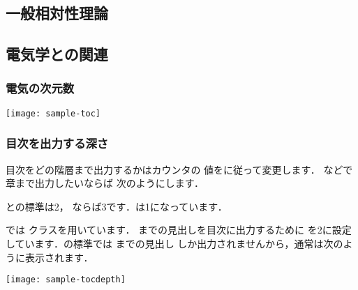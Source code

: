 \begin{inonly}
 \chapter{一般相対性理論}
  \section{電気学との関連}
    \subsection{電気の次元数}

\end{inonly}

\begin{outonly}
\noindent\texttt{[image: sample-toc]}
\end{outonly}


\subsection{目次を出力する深さ}
\begin{usage}
\end{usage}

%
%
目次をどの階層まで出力するかはカウンタの
値をに従って変更します．
などで章まで出力したいならば
次のようにします．

\begin{intext}
\end{intext}


との標準は2，
ならば3です．は1になっています．

では クラスを用いています．
までの見出しを目次に出力するために 
を2に設定しています．の標準では までの見出し
しか出力されませんから，通常は次のように表示されます．
\begin{inonly}
\tableofcontents 
\end{inonly}
\begin{outonly}
\texttt{[image: sample-tocdepth]}
\end{outonly}



